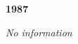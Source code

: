 \begin{center}
  \Huge
  \textbf{1987}
\end{center}

\begin{center}
  \textit{No information}
\end{center}

\vspace{50mm}

\pagebreak
